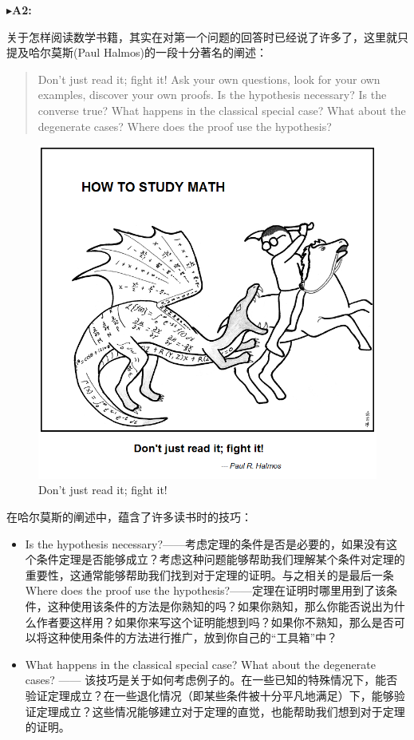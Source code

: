 \documentclass{ctexart}
\begin{document}
\noindent$\blacktriangleright$\;\textbf{A2:}

关于怎样阅读数学书籍，其实在对第一个问题的回答时已经说了许多了，这里就只提及哈尔莫斯(Paul
Halmos)的一段十分著名的阐述：

\begin{quotation}
  \rmfamily Don't just read it; fight it! Ask your own questions, look for your own examples, discover your own proofs. Is the hypothesis necessary? Is the converse true? What happens in the classical special case? What about the degenerate cases? Where does the proof use the hypothesis?
\end{quotation}

\begin{figure}[H]
  \centering
  \includegraphics[width=.5\linewidth]{fig/Halmos.png}
  \caption{Don't just read it; fight it!}
  \label{fig:halmos}
\end{figure}

在哈尔莫斯的阐述中，蕴含了许多读书时的技巧：

\begin{itemize}
\item Is the hypothesis necessary?——考虑定理的条件是否是必要的，如果没有这个条件定理是否能够成立？考虑这种问题能够帮助我们理解某个条件对定理的重要性，这通常能够帮助我们找到对于定理的证明。与之相关的是最后一条Where does the proof use the hypothesis?——定理在证明时哪里用到了该条件，这种使用该条件的方法是你熟知的吗？如果你熟知，那么你能否说出为什么作者要这样用？如果你来写这个证明能想到吗？如果你不熟知，那么是否可以将这种使用条件的方法进行推广，放到你自己的“工具箱”中？
\item What happens in the classical special case? What about the degenerate cases? —— 该技巧是关于如何考虑例子的。在一些已知的特殊情况下，能否验证定理成立？在一些退化情况（即某些条件被十分平凡地满足）下，能够验证定理成立？这些情况能够建立对于定理的直觉，也能帮助我们想到对于定理的证明。
\end{itemize}
\end{document}
